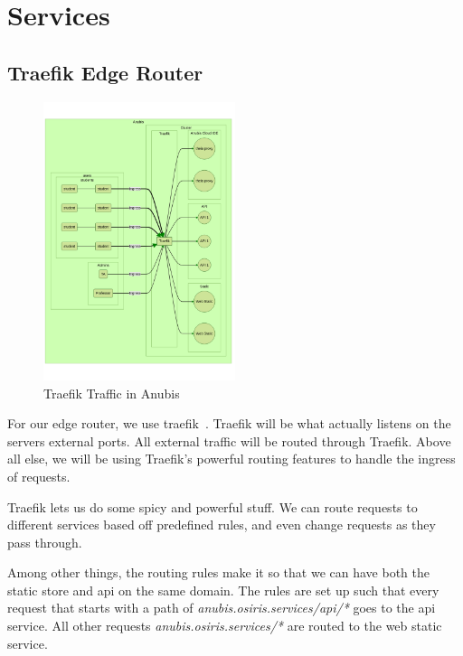 \chapter{Services}\label{ch:services}

\section{Traefik Edge Router}\label{sec:traefik}

\begin{figure}[ht]
    \centering
    \includegraphics[width=0.5\textwidth]{figures/traefik.mmd}
    \caption{Traefik Traffic in Anubis\label{fig:traefik}}
\end{figure}

For our edge router, we use traefik~. 
Traefik will be what actually listens on the servers external ports. 
All external traffic will be routed through Traefik. 
Above all else, we will be using Traefik's powerful routing features to handle the ingress of requests.

Traefik lets us do some spicy and powerful stuff. 
We can route requests to different services based off predefined rules, 
and even change requests as they pass through.

Among other things, the routing rules make it so that we can have 
both the static store and api on the same domain. 
The rules are set up such that every request that 
starts with a path of \textit{anubis.osiris.services/api/*} goes to the api~ service.
All other requests \textit{anubis.osiris.services/*} are routed to the web static~ service.

